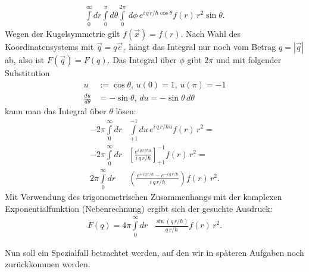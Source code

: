 \documentclass[11pt,a4paper]{scrartcl}
\begin{document}
\begin{enumerate}[label=(\alph*)]
\begin{tcolorbox}[title=Berechnung, breakable]
        \begin{align*}
            \int\limits_0^\infty dr \int\limits_0^{\pi}d\theta \int\limits_0^{2\pi} \, d\phi \, e^{i \, q \, r/\hbar\cos{\theta}} f(r) \, r^2 \sin{\theta}.
        \end{align*}
        Wegen der Kugelsymmetrie gilt $f(\vec{x}) = f(r)$. Nach Wahl des Koordinatensystems mit $\vec{q} = q \vec{e}_z$ hängt das Integral nur noch vom Betrag $q = |\vec{q}|$ ab, also ist $F(\vec{q}) = F(q)$.
        Das Integral über $\phi$ gibt $2\pi$ und mit folgender Substitution
        \begin{align*}
            u &:= \cos{\theta},\, u(0) = 1, \, u(\pi) = -1\\
            \frac{du}{d\theta} &= -\sin{\theta},\, du = -\sin{\theta} \, d\theta
        \end{align*}
        kann man das Integral über $\theta$ lösen:
        \begin{align*}
            - 2 \pi \int\limits_0^\infty dr &\int\limits_{+1}^{-1}du \, e^{i \, q \, r/\hbar u} f(r) \, r^2=\\ 
            - 2 \pi \int\limits_0^\infty dr &\left[\frac{e^{i \, q \, r/\hbar u}}{i \, q \, r/\hbar}\right]_{+1}^{-1} f(r) \, r^2 =\\
            2 \pi \int\limits_0^\infty dr &\left(\frac{e^{+i \, q \, r/\hbar} - e^{-i \, q \, r/\hbar}}{i \, q \, r/\hbar}\right) f(r) \, r^2.
        \end{align*}
        Mit Verwendung des trigonometrischen Zusammenhangs mit der komplexen Exponentialfunktion (Nebenrechnung) ergibt sich der gesuchte Ausdruck:
        \begin{align*}
            F(q) = 4 \pi \int\limits_0^\infty dr &\frac{\sin(q \, r/\hbar)}{q \, r/\hbar} f(r) \, r^2.
        \end{align*}
    \end{tcolorbox}

\end{enumerate}
Nun soll ein Spezialfall betrachtet werden, auf den wir in späteren Aufgaben noch zurückkommen werden.
\end{document}
